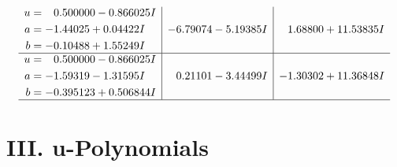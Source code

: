 \documentclass[1p]{elsarticle_modified}
\theoremstyle{definition}
\begin{document}
$$\begin{array}{c|c|c}
\begin{aligned}
u &= \phantom{-}0.500000 - 0.866025 I \\
a &= -1.44025 + 0.04422 I \\
b &= -0.10488 + 1.55249 I\end{aligned}
 & -6.79074 - 5.19385 I & \phantom{-}1.68800 + 11.53835 I \\ \hline\begin{aligned}
u &= \phantom{-}0.500000 - 0.866025 I \\
a &= -1.59319 - 1.31595 I \\
b &= -0.395123 + 0.506844 I\end{aligned}
 & \phantom{-}0.21101 - 3.44499 I & -1.30302 + 11.36848 I\\
 \hline 
 \end{array}$$\newpage
\newpage\renewcommand{\arraystretch}{1}
\centering \section*{ III. u-Polynomials}
\end{document}
